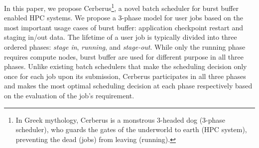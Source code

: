 In this paper, we propose Cerberus\footnote{In Greek mythology,
Cerberus is a monstrous 3-headed dog (3-phase scheduler),
who guards the gates of the underworld to earth (HPC system),
preventing the dead (jobs) from leaving (running).},
a novel batch scheduler for burst buffer enabled HPC systems. 
We propose a 3-phase model for user jobs
based on the most important usage cases of burst buffer: 
application checkpoint restart and staging in/out data. 
The lifetime of a user job is typically divided into three ordered phases:
\textit{stage in}, \textit{running}, and \textit{stage-out}.
While only the running phase requires compute nodes, burst buffer are used for different
purpose in all three phases.
Unlike existing batch schedulers that 
make the scheduling decision only once for each job upon its submission, 
Cerberus participates in all three phases and makes the most optimal
scheduling decision at each phase respectively based on the evaluation of the job's requirement.

